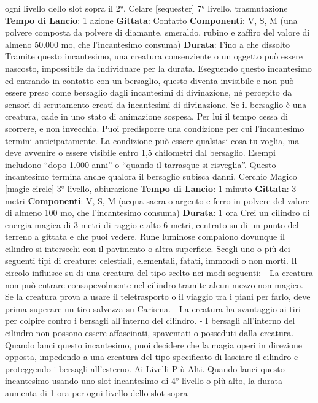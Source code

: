 \begin{multicols}{2}
ogni livello dello slot sopra il 2°.
Celare
[sequester]
7° livello, trasmutazione
\textbf{Tempo di Lancio}: 1 azione
\textbf{Gittata}: Contatto
\textbf{Componenti}: V, S, M (una polvere composta da
polvere di diamante, smeraldo, rubino e zaffiro del
valore di almeno 50.000 mo, che l’incantesimo
consuma)
\textbf{Durata}: Fino a che dissolto
Tramite questo incantesimo, una creatura consenziente
o un oggetto può essere nascosto, impossibile da
individuare per la durata. Eseguendo questo
incantesimo ed entrando in contatto con un bersaglio,
questo diventa invisibile e non può essere preso come
bersaglio dagli incantesimi di divinazione, né percepito
da sensori di scrutamento creati da incantesimi di
divinazione.
Se il bersaglio è una creatura, cade in uno stato di
animazione sospesa. Per lui il tempo cessa di scorrere,
e non invecchia.
Puoi predisporre una condizione per cui l’incantesimo
termini anticipatamente. La condizione può essere
qualsiasi cosa tu voglia, ma deve avvenire o essere
visibile entro 1,5 chilometri dal bersaglio. Esempi
includono “dopo 1.000 anni” o “quando il tarrasque si
risveglia”. Questo incantesimo termina anche qualora il
bersaglio subisca danni.
Cerchio Magico
[magic circle]
3° livello, abiurazione
\textbf{Tempo di Lancio}: 1 minuto
\textbf{Gittata}: 3 metri
\textbf{Componenti}: V, S, M (acqua sacra o argento e ferro in
polvere del valore di almeno 100 mo, che l’incantesimo
consuma)
\textbf{Durata}: 1 ora
Crei un cilindro di energia magica di 3 metri di raggio e
alto 6 metri, centrato su di un punto del terreno a gittata
e che puoi vedere. Rune luminose compaiono
dovunque il cilindro si intersechi con il pavimento o altra
superficie.
Scegli uno o più dei seguenti tipi di creature: celestiali,
elementali, fatati, immondi o non morti. Il circolo
influisce su di una creatura del tipo scelto nei modi
seguenti:
- La creatura non può entrare consapevolmente nel
cilindro tramite alcun mezzo non magico. Se la
creatura prova a usare il teletrasporto o il viaggio tra
i piani per farlo, deve prima superare un tiro
salvezza su Carisma.
- La creatura ha svantaggio ai tiri per colpire contro i
bersagli all’interno del cilindro.
- I bersagli all’interno del cilindro non possono essere
affascinati, spaventati o posseduti dalla creatura.
Quando lanci questo incantesimo, puoi decidere che la
magia operi in direzione opposta, impedendo a una
creatura del tipo specificato di lasciare il cilindro e
proteggendo i bersagli all’esterno.
Ai Livelli Più Alti. Quando lanci questo incantesimo
usando uno slot incantesimo di 4° livello o più alto, la
durata aumenta di 1 ora per ogni livello dello slot sopra

\end{multicols}
